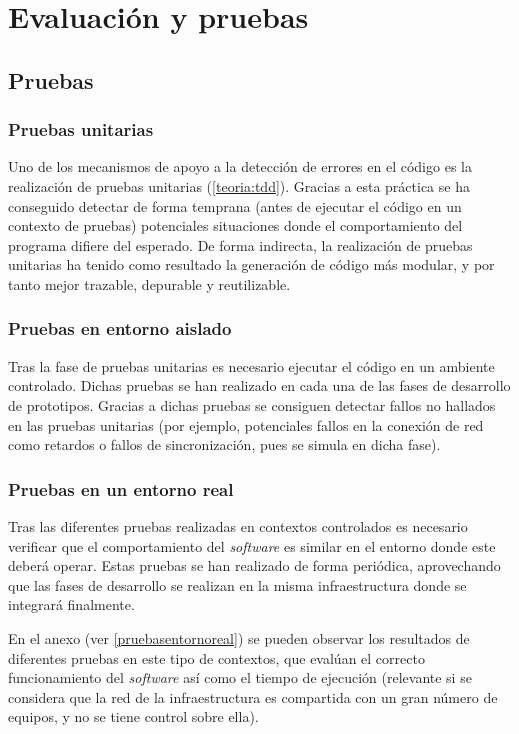 \chapter{Evaluación y pruebas}

\section{Pruebas}

\subsection{Pruebas unitarias}

Uno de los mecanismos de apoyo a la detección de errores en el código es la realización de pruebas unitarias (\ref{teoria:tdd}). Gracias a esta práctica se ha conseguido detectar de forma temprana (antes de ejecutar el código en un contexto de pruebas) potenciales situaciones donde el comportamiento del programa difiere del esperado. De forma indirecta, la realización de pruebas unitarias ha tenido como resultado la generación de código más modular, y por tanto mejor trazable, depurable y reutilizable.

\subsection{Pruebas en entorno aislado}

Tras la fase de pruebas unitarias es necesario ejecutar el código en un ambiente controlado. Dichas pruebas se han realizado en cada una de las fases de desarrollo de prototipos. Gracias a dichas pruebas se consiguen detectar fallos no hallados en las pruebas unitarias (por ejemplo, potenciales fallos en la conexión de red como retardos o fallos de sincronización, pues se simula en dicha fase).

\subsection{Pruebas en un entorno real}

Tras las diferentes pruebas realizadas en contextos controlados es necesario verificar que el comportamiento del \textit{software} es similar en el entorno donde este deberá operar. Estas pruebas se han realizado de forma periódica, aprovechando que las fases de desarrollo se realizan en la misma infraestructura donde se integrará finalmente.

En el anexo  (ver \ref{pruebasentornoreal}) se pueden observar los resultados de diferentes pruebas en este tipo de contextos, que evalúan el correcto funcionamiento del \textit{software} así como el tiempo de ejecución (relevante si se considera que la red de la infraestructura es compartida con un gran número de equipos, y no se tiene control sobre ella).


